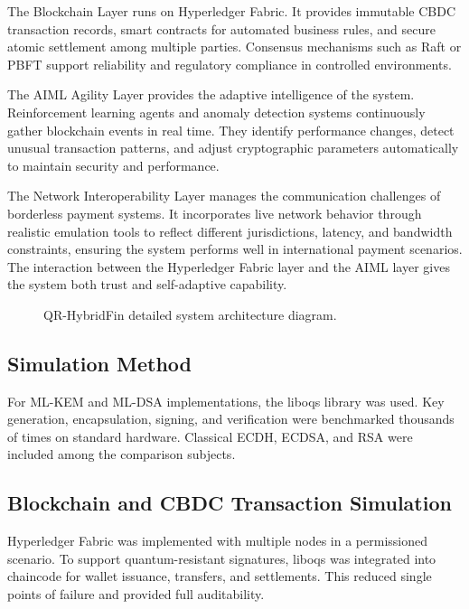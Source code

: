 \documentclass[pdflatex,sn-basic,english]{sn-jnl}
\begin{document}
The Blockchain Layer runs on Hyperledger Fabric. It provides immutable CBDC transaction records, smart contracts for automated business rules, and secure atomic settlement among multiple parties. Consensus mechanisms such as Raft or PBFT support reliability and regulatory compliance in controlled environments.

The AIML Agility Layer provides the adaptive intelligence of the system. Reinforcement learning agents and anomaly detection systems continuously gather blockchain events in real time. They identify performance changes, detect unusual transaction patterns, and adjust cryptographic parameters automatically to maintain security and performance.

The Network Interoperability Layer manages the communication challenges of borderless payment systems. It incorporates live network behavior through realistic emulation tools to reflect different jurisdictions, latency, and bandwidth constraints, ensuring the system performs well in international payment scenarios. The interaction between the Hyperledger Fabric layer and the AIML layer gives the system both trust and self-adaptive capability.

\begin{figure}[htbp]
\centering
{}
\caption{QR-HybridFin detailed system architecture diagram.}
\label{fig:detailed}
\end{figure}

\subsection{Simulation Method}

For ML-KEM and ML-DSA implementations, the liboqs library was used. Key generation, encapsulation, signing, and verification were benchmarked thousands of times on standard hardware. Classical ECDH, ECDSA, and RSA were included among the comparison subjects.

\subsection{Blockchain and CBDC Transaction Simulation}

Hyperledger Fabric was implemented with multiple nodes in a permissioned scenario. To support quantum-resistant signatures, liboqs was integrated into chaincode for wallet issuance, transfers, and settlements. This reduced single points of failure and provided full auditability.
\end{document}
